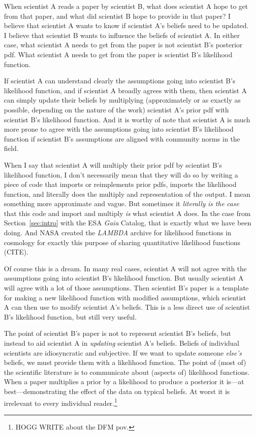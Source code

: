 \documentclass{article}
\newcommand{\sectionname}{Section}
\newcommand{\secref}[1]{\sectionname~\ref{#1}}
\begin{document}
When scientist A reads a paper by scientist B, what does scientist A hope to get from that paper, and what did scientist B hope to provide in that paper?
I believe that scientist A wants to know if scientist A's beliefs need to be updated.
I believe that scientist B wants to influence the beliefs of scientist A.
In either case, what scientist A needs to get from the paper is not scientist B's posterior pdf.
What scientist A needs to get from the paper is scientist B's likelihood function.

If scientist A can understand clearly the assumptions going into scientist B's likelihood function,
and if scientist A broadly agrees with them,
then scientist A can simply update their beliefs by multiplying (approximately or as exactly as possible, depending on the nature of the work)
scientist A's prior pdf with scientist B's likelihood function.
And it is worthy of note that scientist A is much more prone to agree with the assumptions going into scientist B's likelihood function if scientist B's assumptions are aligned with community norms in the field.

When I say that scientist A will multiply their prior pdf by scientist B's likelihood function,
I don't necessarily mean that they will do so by writing a piece of code that imports or reimplements prior pdfs, imports the likelihood function, and literally does the multiply and representation of the output.
I mean something more approximate and vague.
But sometimes it \emph{literally is the case} that this code and import and multiply \emph{is} what scientist A does.
In the case from \secref{sec:intro} with the ESA \textsl{Gaia} Catalog, that is exactly what we have been doing.
And NASA created the \textsl{LAMBDA} archive for likelihood functions in cosmology for exactly this purpose of sharing quantitative likelihood functions (CITE).

Of course this is a dream.
In many real cases, scientist A will not agree with the assumptions going into scientist B's likelihood function.
But usually scientist A will agree with a lot of those assumptions.
Then scientist B's paper is a template for making a new likelihood function with modified assumptions, which scientist A can then use to modify scientist A's beliefs.
This is a less direct use of scientist B's likelihood function, but still very useful.

The point of scientist B's paper is not to represent scientist B's beliefs, but instead to aid scientist A in \emph{updating} scientist A's beliefs.
Beliefs of individual scientists are idiosyncratic and subjective.
If we want to update someone \emph{else's} beliefs, we must provide them with a likelihood function.
The point of (most of) the scientific literature is to communicate about (aspects of) likelihood functions.
When a paper multiplies a prior by a likelihood to produce a posterior it is---at best---demonstrating the effect of the data on typical beliefs.
At worst it is irrelevant to every individual reader.\footnote{%
HOGG WRITE about the DFM pov.}
\end{document}
